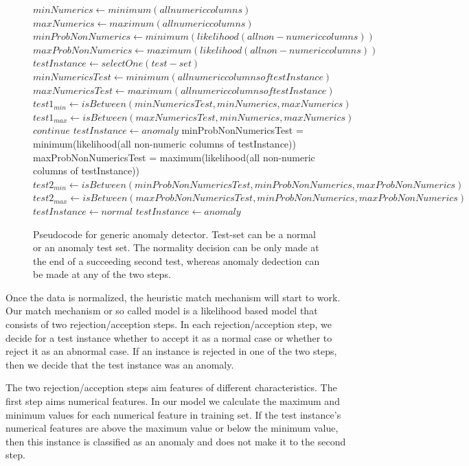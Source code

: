 \documentclass[conference]{IEEEtran}
\begin{document}
\begin{figure}
\renewcommand{\baselinestretch}{1}
\begin{algorithmic} \footnotesize
\STATE $minNumerics \gets minimum(all numeric columns)$
\STATE $maxNumerics \gets maximum(all numeric columns)$
\STATE $minProbNonNumerics \gets minimum(likelihood(all non-numeric columns))$
\STATE $maxProbNonNumerics \gets maximum(likelihood(all non-numeric columns))$
\STATE $testInstance \gets selectOne(test-set)$
\STATE $minNumericsTest \gets minimum(all numeric columns of testInstance)$
\STATE $maxNumericsTest \gets maximum(all numeric columns of testInstance)$
\STATE $test1_{min} \gets isBetween(minNumericsTest,minNumerics,maxNumerics)$
\STATE $test1_{max} \gets isBetween(maxNumericsTest,minNumerics,maxNumerics)$
        \STATE $continue$
\ELSE
        \STATE $testInstance \gets anomaly$
\ENDIF 
\STATE minProbNonNumericsTest = minimum(likelihood(all non-numeric columns of testInstance))
\STATE maxProbNonNumericsTest = maximum(likelihood(all non-numeric columns of testInstance))
\STATE $test2_{min} \gets isBetween(minProbNonNumericsTest,minProbNonNumerics,maxProbNonNumerics)$
\STATE $test2_{max} \gets isBetween(maxProbNonNumericsTest,minProbNonNumerics,maxProbNonNumerics)$
        \STATE $testInstance \gets normal$
\ELSE
        \STATE $testInstance \gets anomaly$
\ENDIF 
\end{algorithmic}
\caption{Pseudocode for generic anomaly detector. Test-set can be a normal or an anomaly test set. The normality decision can be only made at the end of a succeeding second test, whereas anomaly dedection can be made at any of the two steps.}
\label{figure:trainPseudocode}
\end{figure}

Once the data is normalized, the heuristic match mechanism will start to work.
Our match mechanism or so called model is a likelihood based model that consists of two rejection/acception steps.
In each rejection/acception step, we decide for a test instance whether to accept it as a normal case or whether to reject it as an abnormal case.
If an instance is rejected in one of the two steps, then we decide that the test instance was an anomaly.

The two rejection/acception steps aim features of different characteristics.
The first step aims numerical features.
In our model we calculate the maximum and minimum values for each numerical feature in training set.
If the test instance's numerical features are above the maximum value or below the minimum value, then this instance is classified as an anomaly and does not make it to the second step.
\end{document}
